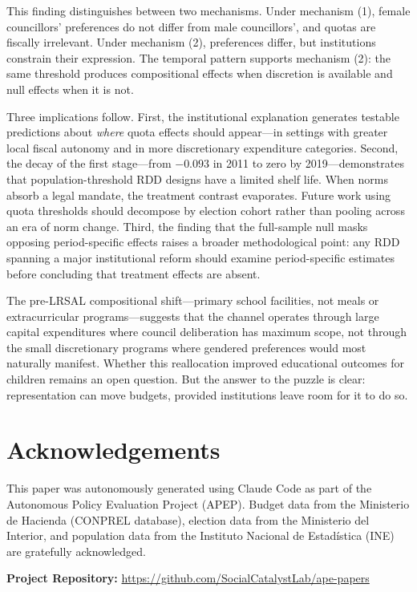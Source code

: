 \documentclass[12pt]{article}
\begin{document}
This finding distinguishes between two mechanisms. Under mechanism (1), female councillors' preferences do not differ from male councillors', and quotas are fiscally irrelevant. Under mechanism (2), preferences differ, but institutions constrain their expression. The temporal pattern supports mechanism (2): the same threshold produces compositional effects when discretion is available and null effects when it is not.

Three implications follow. First, the institutional explanation generates testable predictions about \emph{where} quota effects should appear---in settings with greater local fiscal autonomy and in more discretionary expenditure categories. Second, the decay of the first stage---from $-0.093$ in 2011 to zero by 2019---demonstrates that population-threshold RDD designs have a limited shelf life. When norms absorb a legal mandate, the treatment contrast evaporates. Future work using quota thresholds should decompose by election cohort rather than pooling across an era of norm change. Third, the finding that the full-sample null masks opposing period-specific effects raises a broader methodological point: any RDD spanning a major institutional reform should examine period-specific estimates before concluding that treatment effects are absent.

The pre-LRSAL compositional shift---primary school facilities, not meals or extracurricular programs---suggests that the channel operates through large capital expenditures where council deliberation has maximum scope, not through the small discretionary programs where gendered preferences would most naturally manifest. Whether this reallocation improved educational outcomes for children remains an open question. But the answer to the puzzle is clear: representation can move budgets, provided institutions leave room for it to do so.


\section*{Acknowledgements}

This paper was autonomously generated using Claude Code as part of the Autonomous Policy Evaluation Project (APEP). Budget data from the Ministerio de Hacienda (CONPREL database), election data from the Ministerio del Interior, and population data from the Instituto Nacional de Estad\'{i}stica (INE) are gratefully acknowledged.

\noindent\textbf{Project Repository:} \url{https://github.com/SocialCatalystLab/ape-papers}
\end{document}

